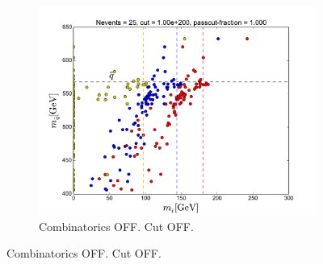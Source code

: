 \documentclass[twoside,english]{uiofysmaster}
\begin{document}
\begin{figure}[hbt]
	\centering
	\begin{subfigure}[b]{0.49\textwidth}
		\includegraphics[width=\textwidth]{figures/making-sense/herwig_combinatorics-OFF_nocut.pdf} 
		\caption{Combinatorics OFF. Cut OFF. }
	\end{subfigure}


\end{figure}
\end{document}
